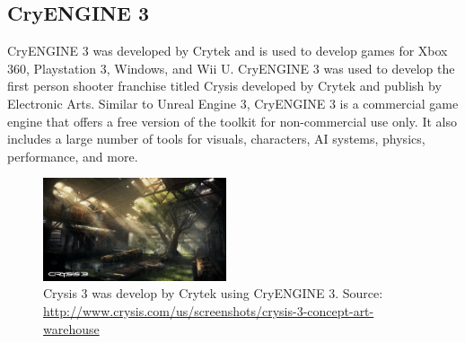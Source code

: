 \subsection{CryENGINE 3}
CryENGINE 3 was developed by Crytek and is used to develop games for Xbox 360, Playstation 3, Windows, and Wii U. CryENGINE 3 was used to develop the first person shooter franchise titled Crysis developed by Crytek and publish by Electronic Arts. Similar to Unreal Engine 3, CryENGINE 3 is a commercial game engine that offers a free version of the toolkit for non-commercial use only. It also includes a large number of tools for visuals, characters, AI systems, physics, performance, and more.
\begin{figure}[h!]
  \centering \includegraphics[width=0.48\textwidth]{Images/Crysis3_Fields_Warehouse_ConceptArt.png}
	\caption{Crysis 3 was develop by Crytek using CryENGINE 3. Source: \url{http://www.crysis.com/us/screenshots/crysis-3-concept-art-warehouse}}
\end{figure}

